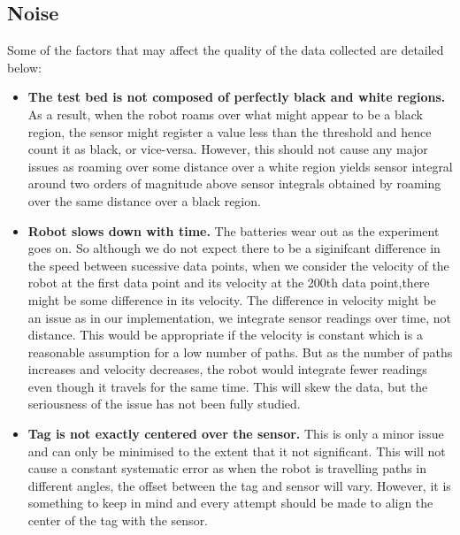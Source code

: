 \documentclass[english]{article}\usepackage[]{graphicx}\usepackage[]{color}
\begin{document}

\subsection{Noise}

Some of the factors that may affect the quality of the data collected are detailed below:
\begin{itemize}
\item \textbf{The test bed is not composed of perfectly black and white regions.} As a result, when the robot roams over what might appear to be a black region, the sensor might register a value less than the threshold and hence count it as black, or vice-versa. However, this should not cause any major issues as roaming over some distance over a white region yields sensor integral around two orders of magnitude above sensor integrals obtained by roaming over the same distance over a black region.
\item \textbf{Robot slows down with time.} The batteries wear out as the experiment goes on. So although we do not expect there to be a siginifcant difference in the speed between sucessive data points, when we consider the velocity of the robot at the first data point and its velocity at the 200th data point,there might be some difference in its velocity. The difference in velocity might be an issue as in our implementation, we integrate sensor readings over time, not distance. This would be appropriate if the velocity is constant which is a reasonable assumption for a low number of paths. But as the number of paths increases and velocity decreases, the robot would integrate fewer readings even though it travels for the same time. This will skew the data, but the seriousness of the issue has not been fully studied.
\item \textbf{Tag is not exactly centered over the sensor.} This is only a minor issue and can only be minimised to the extent that it not significant. This will not cause a constant systematic error as when the robot is travelling paths in different angles, the offset between the tag and sensor will vary. However, it is something to keep in mind and every attempt should be made to align the center of the tag with the sensor.
\end{itemize}
\end{document}
